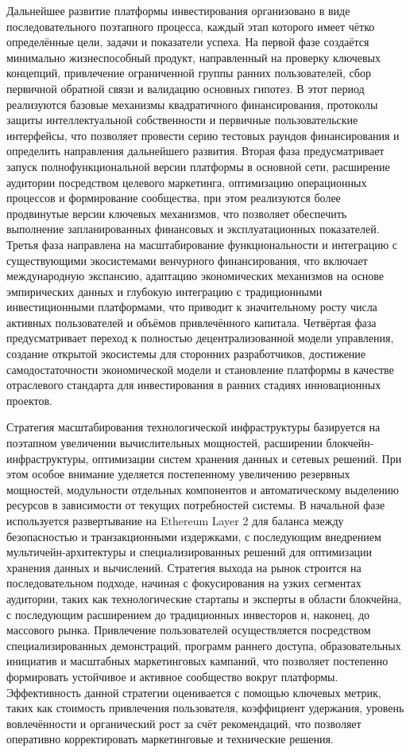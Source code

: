 \documentclass[
    14pt,
    specialist,
    candidate, %
    subf, %
    href,
    dotsinheaders=false
]{disser}
\begin{document}
Дальнейшее развитие платформы инвестирования организовано в виде последовательного поэтапного процесса, каждый этап которого имеет чётко определённые цели, задачи и показатели успеха. На первой фазе создаётся минимально жизнеспособный продукт, направленный на проверку ключевых концепций, привлечение ограниченной группы ранних пользователей, сбор первичной обратной связи и валидацию основных гипотез. В этот период реализуются базовые механизмы квадратичного финансирования, протоколы защиты интеллектуальной собственности и первичные пользовательские интерфейсы, что позволяет провести серию тестовых раундов финансирования и определить направления дальнейшего развития. Вторая фаза предусматривает запуск полнофункциональной версии платформы в основной сети, расширение аудитории посредством целевого маркетинга, оптимизацию операционных процессов и формирование сообщества, при этом реализуются более продвинутые версии ключевых механизмов, что позволяет обеспечить выполнение запланированных финансовых и эксплуатационных показателей. Третья фаза направлена на масштабирование функциональности и интеграцию с существующими экосистемами венчурного финансирования, что включает международную экспансию, адаптацию экономических механизмов на основе эмпирических данных и глубокую интеграцию с традиционными инвестиционными платформами, что приводит к значительному росту числа активных пользователей и объёмов привлечённого капитала. Четвёртая фаза предусматривает переход к полностью децентрализованной модели управления, создание открытой экосистемы для сторонних разработчиков, достижение самодостаточности экономической модели и становление платформы в качестве отраслевого стандарта для инвестирования в ранних стадиях инновационных проектов.

Стратегия масштабирования технологической инфраструктуры базируется на поэтапном увеличении вычислительных мощностей, расширении блокчейн-инфраструктуры, оптимизации систем хранения данных и сетевых решений. При этом особое внимание уделяется постепенному увеличению резервных мощностей, модульности отдельных компонентов и автоматическому выделению ресурсов в зависимости от текущих потребностей системы. В начальной фазе используется развертывание на Ethereum Layer 2 для баланса между безопасностью и транзакционными издержками, с последующим внедрением мультичейн-архитектуры и специализированных решений для оптимизации хранения данных и вычислений. Стратегия выхода на рынок строится на последовательном подходе, начиная с фокусирования на узких сегментах аудитории, таких как технологические стартапы и эксперты в области блокчейна, с последующим расширением до традиционных инвесторов и, наконец, до массового рынка. Привлечение пользователей осуществляется посредством специализированных демонстраций, программ раннего доступа, образовательных инициатив и масштабных маркетинговых кампаний, что позволяет постепенно формировать устойчивое и активное сообщество вокруг платформы. Эффективность данной стратегии оценивается с помощью ключевых метрик, таких как стоимость привлечения пользователя, коэффициент удержания, уровень вовлечённости и органический рост за счёт рекомендаций, что позволяет оперативно корректировать маркетинговые и технические решения.
\end{document}
